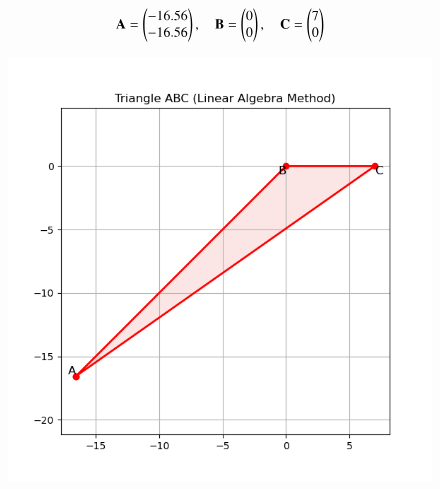 \documentclass{article}
\begin{document}
\begin{align}
\mathbf{A} = \begin{pmatrix}-16.56 \\ -16.56\end{pmatrix}, \quad
\mathbf{B} = \begin{pmatrix}0 \\ 0\end{pmatrix}, \quad
\mathbf{C} = \begin{pmatrix}7 \\ 0\end{pmatrix}
\end{align}


\begin{figure}[H]
    \centering
    \includegraphics[width=0.7\linewidth]{./figs/Figure_1.png}
    \caption{}
    \label{fig:fig1}
\end{figure}
\end{document}
